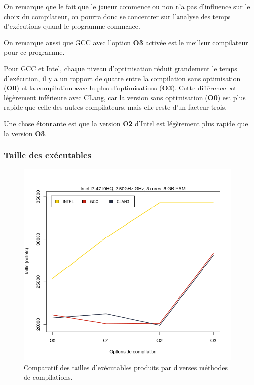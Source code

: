 \documentclass[
 aip,
 jmp,
 amsmath,amssymb,
 reprint
]{revtex4-1}
\begin{document}
On remarque que le fait que le joueur commence\pageref{Fig:temps_exec_j1} ou non\pageref{Fig:temps_exec_j2} n'a pas d'influence sur le choix du compilateur, on pourra donc se concentrer sur l'analyse des temps d'exécutions quand le programme commence.\par
On remarque aussi que GCC avec l'option \textbf{O3} activée est le meilleur compilateur pour ce programme.\par
Pour GCC et Intel, chaque niveau d'optimisation réduit grandement le temps d'exécution, il y a un rapport de quatre entre la compilation sans optimisation (\textbf{O0}) et la compilation avec le plus d'optimisations (\textbf{O3}). Cette différence est légèrement inférieure avec CLang, car la version sans optimisation (\textbf{O0}) est plus rapide que celle des autres compilateurs, mais elle reste d'un facteur trois.\par
Une chose étonnante est que la version \textbf{O2} d'Intel est légèrement plus rapide que la version \textbf{O3}.

\subsubsection{Taille des exécutables}
\begin{figure}[H]
  \includegraphics[width=\linewidth, keepaspectratio=true]{tailles.png}
  \caption{Comparatif des tailles d'exécutables produits par diverses méthodes de compilations.\label{Fig:taille_executables_seq}}
\end{figure}
\end{document}
